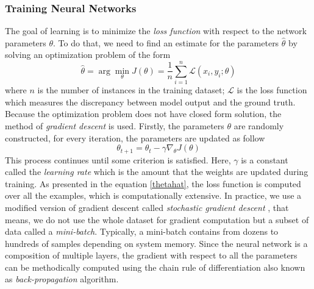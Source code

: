 \documentclass[conference]{IEEEtran}
\begin{document}
\subsubsection{Training Neural Networks}
The goal of learning is to minimize the \textit{loss function} with respect to the network parameters $\theta$. To do that, we need to find an estimate for the parameters $\hat{\theta}$ by solving an optimization problem of the form
\begin{equation}
    \label{thetahat}
    \hat{\theta} = \arg \min_{\theta}J(\theta)= \frac{1}{n}\sum_{i=1}^{n}\mathcal{L}(x_i, y_i; \theta)
\end{equation}
where $n$ is the number of instances in the training dataset; $\mathcal{L}$ is the loss function which measures the discrepancy between model output and the ground truth. Because the optimization problem does not have closed form solution, the method of \textit{gradient descent} is used. Firstly, the parameters $\theta$ are randomly constructed, for every iteration, the parameters are updated as follow
\begin{equation}
    \theta_{t+1} = \theta_t - \gamma\nabla_{\theta} J(\theta)
\end{equation}
 This process continues until some criterion is satisfied. Here, $\gamma$ is a constant called the \textit{learning rate} which is the amount that the weights are updated during training. As presented in the equation \ref{thetahat}, the loss function is computed over all the examples, which is computationally extensive. In practice, we use a modified version of gradient descent called \textit{stochastic gradient descent} , that means, we do not use the whole dataset for gradient computation but a subset of data called a \textit{mini-batch}. Typically, a mini-batch contains from dozens to hundreds of samples depending on system memory. Since the neural network is a composition of multiple layers, the gradient with respect to all the parameters can be methodically computed using the chain rule of differentiation also known as \textit{back-propagation} algorithm.
\end{document}
